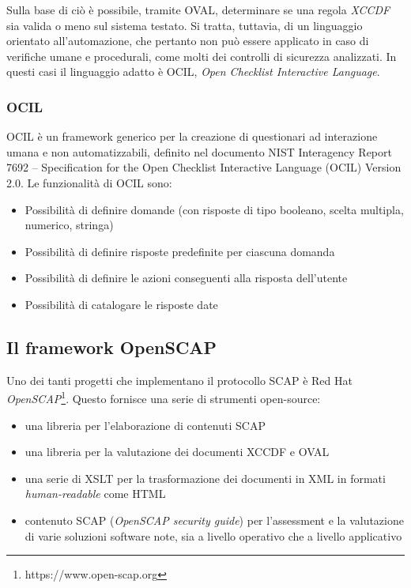 \documentclass[../main.tex]{subfiles}
\begin{document}
Sulla base di ciò è possibile, tramite OVAL, determinare se una regola \textit{XCCDF} sia valida o meno sul sistema testato. 
Si tratta, tuttavia, di un linguaggio orientato all'automazione, che pertanto non può essere applicato in caso di verifiche umane e procedurali, come molti dei controlli di sicurezza analizzati.
In questi casi il linguaggio adatto è OCIL, \textit{Open Checklist Interactive Language}.

\subsubsection{OCIL}
OCIL è un framework generico per la creazione di questionari ad interazione umana e non automatizzabili, definito nel documento NIST Interagency Report 7692 – Specification for the Open Checklist Interactive Language (OCIL) Version 2.0.
Le funzionalità di OCIL sono:
\begin{itemize}
    \item Possibilità di definire domande (con risposte di tipo booleano, scelta multipla, numerico, stringa)
    \item Possibilità di definire risposte predefinite per ciascuna domanda
    \item Possibilità di definire le azioni conseguenti alla risposta dell'utente 
    \item Possibilità di catalogare le risposte date
\end{itemize}

\subsection{Il framework OpenSCAP}
Uno dei tanti progetti che implementano il protocollo SCAP è Red Hat \textit{OpenSCAP}\footnote{https://www.open-scap.org}.
Questo fornisce una serie di strumenti open-source:
\begin{itemize}
    \item una libreria per l'elaborazione di contenuti SCAP
    \item una libreria per la valutazione dei documenti XCCDF e OVAL
    \item una serie di XSLT per la trasformazione dei documenti in XML in formati \textit{human-readable} come HTML
    \item contenuto SCAP (\textit{OpenSCAP security guide}) per l'assessment e la valutazione di varie soluzioni software note, sia a livello operativo che a livello applicativo
\end{itemize}
\end{document}
